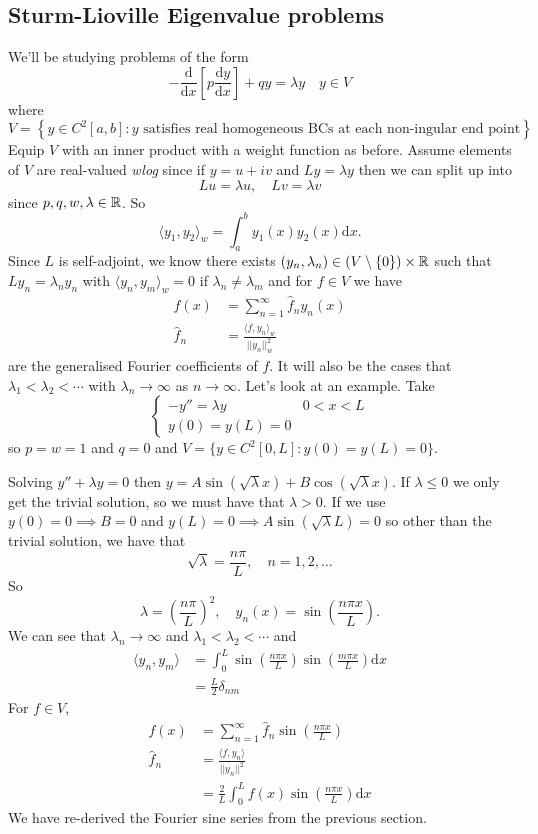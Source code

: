 \documentclass{article}
\begin{document}
 \subsection{Sturm-Lioville Eigenvalue problems}
 We'll be studying problems of the form
 \[
	 -\frac{\mathrm d}{\mathrm dx}\left[p\frac{\mathrm dy}{\mathrm dx}\right] + qy = \lambda y\quad y\in V
 \]
 where
 \[
	 V=\left\{y\in C^2[a,b]:y\text{ satisfies real homogeneous BCs at each non-ingular end point} \right\}
 \]
 Equip $ V $ with an inner product with a weight function as before. Assume elements of $ V $ are real-valued \textit{wlog} since if $ y=u+iv $ and $ Ly=\lambda y $ then we can split up into
 \[
   Lu=\lambda u, \quad Lv=\lambda v
 \]
 since $ p,q,w,\lambda\in \mathbb{R} $. So
 \[
	 \langle y_1,y_2\rangle_w=\int_a^by_1(x)y_2(x)\mathrm dx.
 \]
 Since $ L $ is self-adjoint, we know there exists $ (y_n,\lambda_n)\in (V\setminus \{0\})\times \mathbb{R} $ such that $ Ly_n=\lambda_ny_n $ with $ \langle y_n,y_m\rangle_w=0 $ if $ \lambda_n\ne \lambda_m $ and for $ f\in V $ we have
 \begin{align*}
	 f(x)&=\sum_{n=1}^\infty \hat f_n y_n(x)\\
	 \hat f_n&=\frac{\langle f,y_n\rangle_w}{||y_n||^2_w}
 \end{align*}
 are the generalised Fourier coefficients of $ f $. It will also be the cases that $ \lambda_1<\lambda_2<\cdots $ with $ \lambda_n\to \infty $ as $ n\to \infty $. Let's look at an example. Take
 \[
   \begin{cases}
	   -y''=\lambda y & 0<x<L \\
	   y(0)=y(L)=0
   \end{cases}
 \]
 so $ p=w=1 $ and $ q=0 $ and $ V=\{y\in C^2[0,L]: y(0)=y(L)=0\} $.\par
 Solving $ y''+\lambda y= 0 $ then $ y=A\sin(\sqrt{\lambda}x)+B\cos(\sqrt{\lambda}x) $. If $ \lambda\le 0 $ we only get the trivial solution, so we must have that $ \lambda>0 $. If we use $ y(0)=0\implies B=0 $ and $ y(L)=0\implies A\sin(\sqrt{\lambda}L)=0 $ so other than the trivial solution, we have that
 \[
	 \sqrt\lambda = \frac{n\pi}L,\quad n=1,2,\dots
 \]
 So
 \[
	 \lambda = \left(\frac{n\pi}L\right)^2,\quad y_n(x)=\sin\left(\frac{n\pi x}L\right).
 \]
We can see that $ \lambda_n\to \infty $ and $ \lambda_1<\lambda_2<\cdots $ and
\begin{align*}
	\langle y_n,y_m\rangle &= \int_0^L\sin\left(\frac{n\pi x}L\right)\sin\left(\frac{m\pi x}L\right)\mathrm dx \\
			       &= \frac L2\delta_{nm}
\end{align*}
For $ f\in V $,
\begin{align*}
	f(x)&=\sum_{n=1}^\infty \hat f_n\sin\left(\frac{n\pi x}L\right)\\
	\hat f_n&=\frac{\langle f,y_n\rangle}{||y_n||^2}\\
		&= \frac 2L\int_0^Lf(x)\sin\left(\frac{n\pi x}L\right)\mathrm dx
\end{align*}
We have re-derived the Fourier sine series from the previous section.
\end{document}
